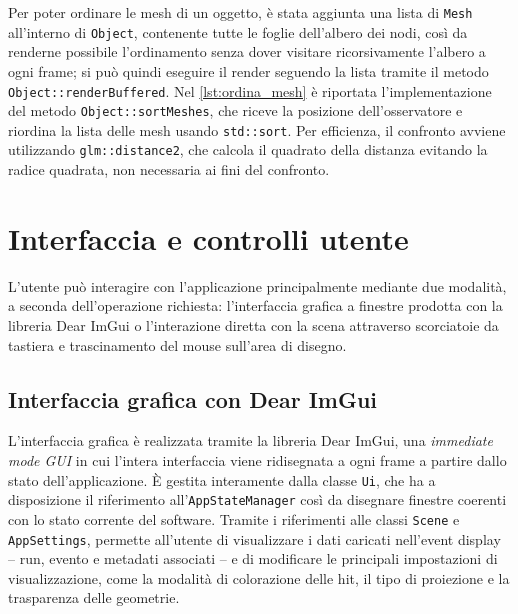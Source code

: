 Per poter ordinare le mesh di un oggetto, è stata aggiunta una lista di \texttt{Mesh} all'interno di \texttt{Object}, contenente tutte le foglie dell'albero dei nodi, così da renderne possibile l'ordinamento senza dover visitare ricorsivamente l'albero a ogni frame; si può quindi eseguire il render seguendo la lista tramite il metodo \texttt{Object::renderBuffered}.
Nel \cref{lst:ordina_mesh} è riportata l'implementazione del metodo \texttt{Object::sortMeshes}, che riceve la posizione dell'osservatore e riordina la lista delle mesh usando \texttt{std::sort}.
Per efficienza, il confronto avviene utilizzando \texttt{glm::\allowbreak{}distance2}, che calcola il quadrato della distanza evitando la radice quadrata, non necessaria ai fini del confronto.



%
%
\section{Interfaccia e controlli utente}
L'utente può interagire con l'applicazione principalmente mediante due modalità, a seconda dell'operazione richiesta: l'interfaccia grafica a finestre prodotta con la libreria Dear ImGui o l'interazione diretta con la scena attraverso scorciatoie da tastiera e trascinamento del mouse sull'area di disegno.

\subsection{Interfaccia grafica con Dear ImGui}
L'interfaccia grafica è realizzata tramite la libreria Dear ImGui, una \emph{immediate mode GUI} in cui l'intera interfaccia viene ridisegnata a ogni frame a partire dallo stato dell'applicazione.
È gestita interamente dalla classe \texttt{Ui}, che ha a disposizione il riferimento all'\texttt{AppStateManager} così da disegnare finestre coerenti con lo stato corrente del software.
Tramite i riferimenti alle classi \texttt{Scene} e \texttt{AppSettings}, permette all'utente di visualizzare i dati caricati nell'event display -- run, evento e metadati associati -- e di modificare le principali impostazioni di visualizzazione, come la modalità di colorazione delle hit, il tipo di proiezione e la trasparenza delle geometrie.

